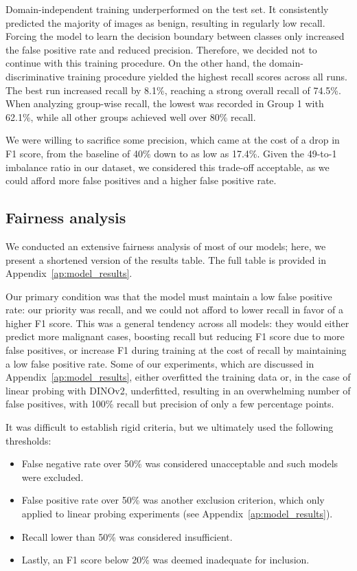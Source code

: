 Domain-independent training underperformed on the test set. It consistently predicted the majority of images as benign, resulting in regularly low recall. Forcing the model to learn the decision boundary between classes only increased the false positive rate and reduced precision. Therefore, we decided not to continue with this training procedure.
On the other hand, the domain-discriminative training procedure yielded the highest recall scores across all runs. The best run increased recall by 8.1\%, reaching a strong overall recall of 74.5\%. When analyzing group-wise recall, the lowest was recorded in Group 1 with 62.1\%, while all other groups achieved well over 80\% recall.

We were willing to sacrifice some precision, which came at the cost of a drop in F1 score, from the baseline of 40\% down to as low as 17.4\%. Given the 49-to-1 imbalance ratio in our dataset, we considered this trade-off acceptable, as we could afford more false positives and a higher false positive rate.

\subsection{Fairness analysis}
We conducted an extensive fairness analysis of most of our models; here, we present a shortened version of the results table. The full table is provided in Appendix~\ref{ap:model_results}.

Our primary condition was that the model must maintain a low false positive rate: our priority was recall, and we could not afford to lower recall in favor of a higher F1 score. This was a general tendency across all models: they would either predict more malignant cases, boosting recall but reducing F1 score due to more false positives, or increase F1 during training at the cost of recall by maintaining a low false positive rate. Some of our experiments, which are discussed in Appendix~\ref{ap:model_results}, either overfitted the training data or, in the case of linear probing with DINOv2, underfitted, resulting in an overwhelming number of false positives, with 100\% recall but precision of only a few percentage points.

It was difficult to establish rigid criteria, but we ultimately used the following thresholds: 
\begin{itemize}
    \item False negative rate over 50\% was considered unacceptable and such models were excluded.
    \item False positive rate over 50\% was another exclusion criterion, which only applied to linear probing experiments (see Appendix~\ref{ap:model_results}).
    \item Recall lower than 50\% was considered insufficient.
    \item Lastly, an F1 score below 20\% was deemed inadequate for inclusion.
\end{itemize}

